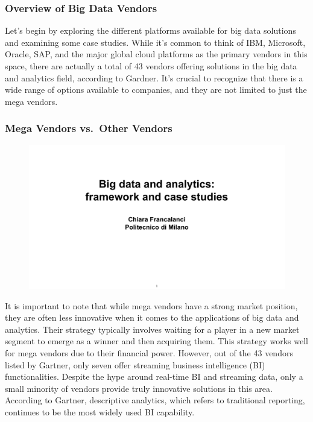 \subsubsection{Overview of Big Data Vendors}

Let's begin by exploring the different platforms available for big data
solutions and examining some case studies. While it's common to think of
IBM, Microsoft, Oracle, SAP, and the major global cloud platforms as the
primary vendors in this space, there are actually a total of 43 vendors
offering solutions in the big data and analytics field, according to
Gardner. It's crucial to recognize that there is a wide range of options
available to companies, and they are not limited to just the mega
vendors.

\subsubsection{Mega Vendors vs.~Other Vendors}


\begin{figure}[!h]
  \centering
  \includegraphics[page=57, trim = 0cm 2.5cm 0cm 4.5cm, clip, width=\imagewidth]{images/06 - BIG_DATA.pdf}
\end{figure}

It is important to note that while mega vendors have a strong market
position, they are often less innovative when it comes to the
applications of big data and analytics. Their strategy typically
involves waiting for a player in a new market segment to emerge as a
winner and then acquiring them. This strategy works well for mega
vendors due to their financial power. However, out of the 43 vendors
listed by Gartner, only seven offer streaming business intelligence (BI)
functionalities. Despite the hype around real-time BI and streaming
data, only a small minority of vendors provide truly innovative
solutions in this area. According to Gartner, descriptive analytics,
which refers to traditional reporting, continues to be the most widely
used BI capability.

